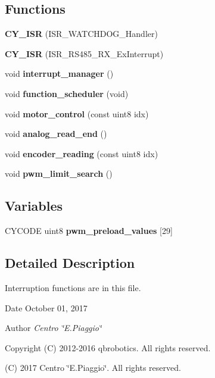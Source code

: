 \subsection*{Functions}
\begin{DoxyCompactItemize}
\item 
\mbox{\label{interruptions_8c_aba74df0c62c62434ebccf8124c5d5fef}} 
{\bfseries C\+Y\+\_\+\+I\+SR} (I\+S\+R\+\_\+\+W\+A\+T\+C\+H\+D\+O\+G\+\_\+\+Handler)
\item 
\mbox{\label{interruptions_8c_a7692d8c3185943c5bdfaa6de0a172ad3}} 
{\bfseries C\+Y\+\_\+\+I\+SR} (I\+S\+R\+\_\+\+R\+S485\+\_\+\+R\+X\+\_\+\+Ex\+Interrupt)
\item 
\mbox{\label{interruptions_8c_a9790811526002d99b25a814afd02cbae}} 
void {\bfseries interrupt\+\_\+manager} ()
\item 
\mbox{\label{interruptions_8c_a39df971c4e9f194be50c54dfd7aeabfe}} 
void {\bfseries function\+\_\+scheduler} (void)
\item 
\mbox{\label{interruptions_8c_a717216ab689fc8b8ea3fb8795a816a2b}} 
void {\bfseries motor\+\_\+control} (const uint8 idx)
\item 
\mbox{\label{interruptions_8c_a00a8d34962a63161405e5d7785b9625e}} 
void {\bfseries analog\+\_\+read\+\_\+end} ()
\item 
\mbox{\label{interruptions_8c_af8d2e8be60bb142650c4fcf4b782fb14}} 
void {\bfseries encoder\+\_\+reading} (const uint8 idx)
\item 
\mbox{\label{interruptions_8c_ab7b287cf5df2ea548297b951be2f20d4}} 
void {\bfseries pwm\+\_\+limit\+\_\+search} ()
\end{DoxyCompactItemize}
\subsection*{Variables}
\begin{DoxyCompactItemize}
\item 
C\+Y\+C\+O\+DE uint8 {\bfseries pwm\+\_\+preload\+\_\+values} [29]
\end{DoxyCompactItemize}


\subsection{Detailed Description}
Interruption functions are in this file. 

\begin{DoxyDate}{Date}
October 01, 2017 
\end{DoxyDate}
\begin{DoxyAuthor}{Author}
{\itshape Centro \char`\"{}\+E.\+Piaggio\char`\"{}} 
\end{DoxyAuthor}
\begin{DoxyCopyright}{Copyright}
(C) 2012-\/2016 qbrobotics. All rights reserved. 

(C) 2017 Centro \char`\"{}\+E.\+Piaggio\char`\"{}. All rights reserved. 
\end{DoxyCopyright}


